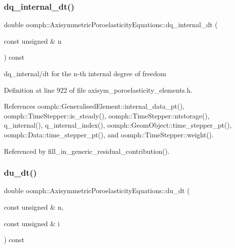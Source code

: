 \subsubsection{\texorpdfstring{dq\+\_\+internal\+\_\+dt()}{dq\_internal\_dt()}}
{\footnotesize\ttfamily double oomph\+::\+Axisymmetric\+Poroelasticity\+Equations\+::dq\+\_\+internal\+\_\+dt (\begin{DoxyParamCaption}\item[{const unsigned \&}]{n }\end{DoxyParamCaption}) const\hspace{0.3cm}{\ttfamily [inline]}}



dq\+\_\+internal/dt for the n-\/th internal degree of freedom 



Definition at line 922 of file axisym\+\_\+poroelasticity\+\_\+elements.\+h.



References oomph\+::\+Generalised\+Element\+::internal\+\_\+data\+\_\+pt(), oomph\+::\+Time\+Stepper\+::is\+\_\+steady(), oomph\+::\+Time\+Stepper\+::ntstorage(), q\+\_\+internal(), q\+\_\+internal\+\_\+index(), oomph\+::\+Geom\+Object\+::time\+\_\+stepper\+\_\+pt(), oomph\+::\+Data\+::time\+\_\+stepper\+\_\+pt(), and oomph\+::\+Time\+Stepper\+::weight().



Referenced by fill\+\_\+in\+\_\+generic\+\_\+residual\+\_\+contribution().

\mbox{\label{classoomph_1_1AxisymmetricPoroelasticityEquations_a5544e6c2ff2d40788b45a114ed1ccfd2}} 
\subsubsection{\texorpdfstring{du\+\_\+dt()}{du\_dt()}}
{\footnotesize\ttfamily double oomph\+::\+Axisymmetric\+Poroelasticity\+Equations\+::du\+\_\+dt (\begin{DoxyParamCaption}\item[{const unsigned \&}]{n,  }\item[{const unsigned \&}]{i }\end{DoxyParamCaption}) const\hspace{0.3cm}{\ttfamily [inline]}}




